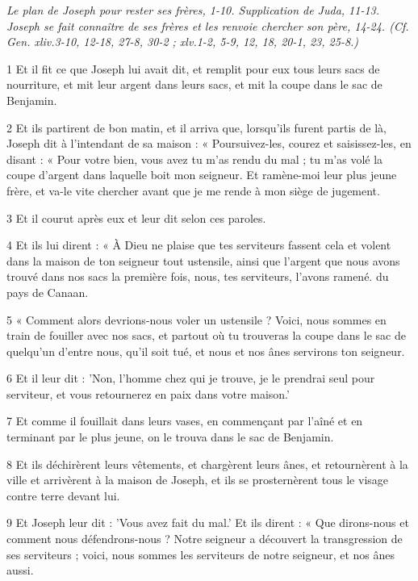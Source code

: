 
\par \textit{Le plan de Joseph pour rester ses frères, 1-10. Supplication de Juda, 11-13. Joseph se fait connaître de ses frères et les renvoie chercher son père, 14-24. (Cf. Gen. xliv.3-10, 12-18, 27-8, 30-2 ; xlv.1-2, 5-9, 12, 18, 20-1, 23, 25-8.)}

\par 1 Et il fit ce que Joseph lui avait dit, et remplit pour eux tous leurs sacs de nourriture, et mit leur argent dans leurs sacs, et mit la coupe dans le sac de Benjamin.
\par 2 Et ils partirent de bon matin, et il arriva que, lorsqu'ils furent partis de là, Joseph dit à l'intendant de sa maison : « Poursuivez-les, courez et saisissez-les, en disant : « Pour votre bien, vous avez tu m'as rendu du mal ; tu m'as volé la coupe d'argent dans laquelle boit mon seigneur. Et ramène-moi leur plus jeune frère, et va-le vite chercher avant que je me rende à mon siège de jugement.
\par 3 Et il courut après eux et leur dit selon ces paroles.
\par 4 Et ils lui dirent : « À Dieu ne plaise que tes serviteurs fassent cela et volent dans la maison de ton seigneur tout ustensile, ainsi que l'argent que nous avons trouvé dans nos sacs la première fois, nous, tes serviteurs, l'avons ramené. du pays de Canaan.
\par 5 « Comment alors devrions-nous voler un ustensile ? Voici, nous sommes en train de fouiller avec nos sacs, et partout où tu trouveras la coupe dans le sac de quelqu'un d'entre nous, qu'il soit tué, et nous et nos ânes servirons ton seigneur.
\par 6 Et il leur dit : 'Non, l'homme chez qui je trouve, je le prendrai seul pour serviteur, et vous retournerez en paix dans votre maison.'
\par 7 Et comme il fouillait dans leurs vases, en commençant par l'aîné et en terminant par le plus jeune, on le trouva dans le sac de Benjamin.
\par 8 Et ils déchirèrent leurs vêtements, et chargèrent leurs ânes, et retournèrent à la ville et arrivèrent à la maison de Joseph, et ils se prosternèrent tous le visage contre terre devant lui.
\par 9 Et Joseph leur dit : 'Vous avez fait du mal.' Et ils dirent : « Que dirons-nous et comment nous défendrons-nous ? Notre seigneur a découvert la transgression de ses serviteurs ; voici, nous sommes les serviteurs de notre seigneur, et nos ânes aussi.
